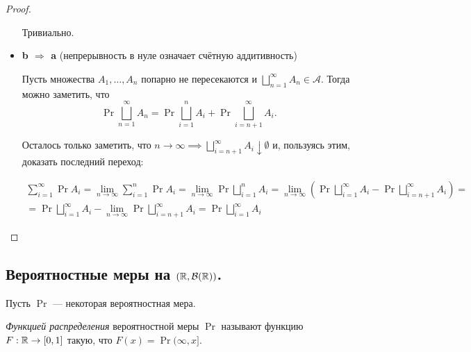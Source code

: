 \begin{proof}
\begin{itemize}
            Тривиально.

        \item \textbf{b $\Rightarrow$ a} (непрерывность в нуле означает счётную аддитивность)

            Пусть множества $A_1, \ldots, A_n$ попарно не пересекаются и $\bigsqcup\limits_{n=1}^{\infty}A_n
            \in \mathcal{A}$. Тогда можно заметить, что
            \[
                \Pr{\bigsqcup\limits_{n=1}^{\infty}A_n} =
                \Pr{\bigsqcup\limits_{i=1}^{n}A_i} +
                \Pr{\bigsqcup\limits_{i=n+1}^{\infty}A_i}.
            \]

            Осталось только заметить, что $n\to\infty \implies \bigsqcup\limits_{i=n+1}^{\infty}A_i
            \downarrow \emptyset$ и, пользуясь этим, доказать последний переход:

            \begin{multline*}
                \sum\limits_{i = 1}^{\infty}\Pr{A_i} =
                \lim\limits_{n\to\infty} \sum\limits_{i = 1}^{n}\Pr{A_i} =
                \lim\limits_{n\to\infty} \Pr{\bigsqcup\limits_{i = 1}^{n}A_i} =
                \lim\limits_{n\to\infty} \left(
                    \Pr{\bigsqcup\limits_{i = 1}^{\infty}A_i} -
                    \Pr{\bigsqcup\limits_{i = n+1}^{\infty}A_i}
                \right) =\\=
                \Pr{\bigsqcup\limits_{i = 1}^{\infty}A_i} -
                \lim\limits_{n\to\infty} \Pr{\bigsqcup\limits_{i = n+1}^{\infty}A_i} =
                \Pr{\bigsqcup\limits_{i = 1}^{\infty}A_i}
            \end{multline*}
    \end{itemize}
\end{proof}


\subsection{Вероятностные меры на $\left( \mathbb{R}, \mathcal{B}(\mathbb{R}) \right)$.}
    Пусть $\Pr$ --- некоторая вероятностная мера.

    \begin{definition}
        \emph{Функцией распределения} вероятностной меры $\Pr$ называют функцию $F: \mathbb{R} \to [0, 1]$ такую, что
        $F(x) = \Pr{(\infty, x]}$.
    \end{definition}

